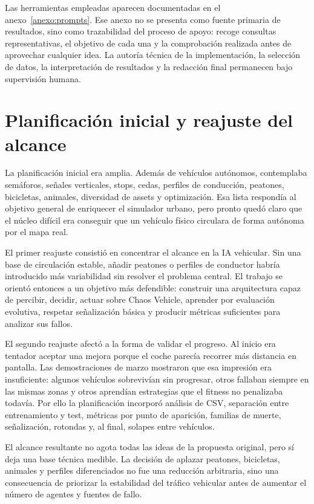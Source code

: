 Las herramientas empleadas aparecen documentadas en el anexo~\ref{anexo:prompts}. Ese anexo no se presenta como fuente primaria de resultados, sino como trazabilidad del proceso de apoyo: recoge consultas representativas, el objetivo de cada una y la comprobación realizada antes de aprovechar cualquier idea. La autoría técnica de la implementación, la selección de datos, la interpretación de resultados y la redacción final permanecen bajo supervisión humana.

\section{Planificación inicial y reajuste del alcance}

La planificación inicial era amplia. Además de vehículos autónomos, contemplaba semáforos, señales verticales, stops, cedas, perfiles de conducción, peatones, bicicletas, animales, diversidad de assets y optimización. Esa lista respondía al objetivo general de enriquecer el simulador urbano, pero pronto quedó claro que el núcleo difícil era conseguir que un vehículo físico circulara de forma autónoma por el mapa real.

El primer reajuste consistió en concentrar el alcance en la IA vehicular. Sin una base de circulación estable, añadir peatones o perfiles de conductor habría introducido más variabilidad sin resolver el problema central. El trabajo se orientó entonces a un objetivo más defendible: construir una arquitectura capaz de percibir, decidir, actuar sobre Chaos Vehicle, aprender por evaluación evolutiva, respetar señalización básica y producir métricas suficientes para analizar sus fallos.

El segundo reajuste afectó a la forma de validar el progreso. Al inicio era tentador aceptar una mejora porque el coche parecía recorrer más distancia en pantalla. Las demostraciones de marzo mostraron que esa impresión era insuficiente: algunos vehículos sobrevivían sin progresar, otros fallaban siempre en las mismas zonas y otros aprendían estrategias que el fitness no penalizaba todavía. Por ello la planificación incorporó análisis de CSV, separación entre entrenamiento y test, métricas por punto de aparición, familias de muerte, señalización, rotondas y, al final, solapes entre vehículos.

El alcance resultante no agota todas las ideas de la propuesta original, pero sí deja una base técnica medible. La decisión de aplazar peatones, bicicletas, animales y perfiles diferenciados no fue una reducción arbitraria, sino una consecuencia de priorizar la estabilidad del tráfico vehicular antes de aumentar el número de agentes y fuentes de fallo.

